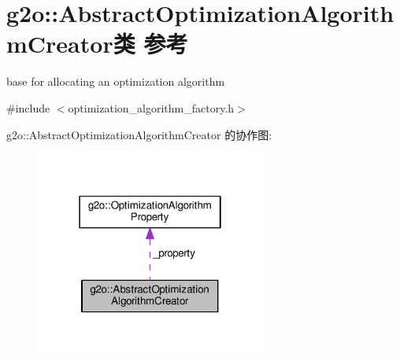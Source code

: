 \hypertarget{classg2o_1_1AbstractOptimizationAlgorithmCreator}{\section{g2o\-:\-:Abstract\-Optimization\-Algorithm\-Creator类 参考}
\label{classg2o_1_1AbstractOptimizationAlgorithmCreator}
}


base for allocating an optimization algorithm  




{\ttfamily \#include $<$optimization\-\_\-algorithm\-\_\-factory.\-h$>$}



g2o\-:\-:Abstract\-Optimization\-Algorithm\-Creator 的协作图\-:
\nopagebreak
\begin{figure}[H]
\begin{center}
\leavevmode
\includegraphics[width=214pt]{classg2o_1_1AbstractOptimizationAlgorithmCreator__coll__graph}
\end{center}
\end{figure}

